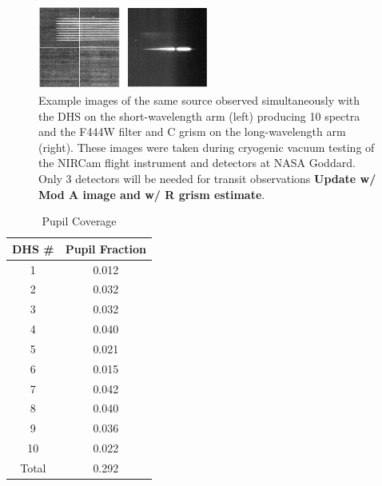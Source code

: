 \documentclass[iop]{emulateapj}
\begin{document}
\begin{figure}[!ht]
\includegraphics[width=0.5\textwidth]{dhs_image_example.png}
\caption{Example images of the same source observed simultaneously with the DHS on the short-wavelength arm (left) producing 10 spectra and the F444W filter and C grism on the long-wavelength arm (right).
These images were taken during cryogenic vacuum testing of the NIRCam flight instrument and detectors at NASA Goddard.
Only 3 detectors will be needed for transit observations \textbf{Update w/ Mod A image and w/ R grism estimate}.}\label{fig:DHSimage}
\end{figure}

\begin{table}
\centering
\begin{tabular}{cc}
DHS \# & Pupil Fraction \\
\hline \hline
1 & 0.012 \\
2 & 0.032 \\
3 &  0.032 \\
4 & 0.040 \\
5 & 0.021 \\
6 & 0.015 \\
7 & 0.042 \\
8 & 0.040 \\
9 & 0.036 \\
10 & 0.022 \\
\hline
Total & 0.292
\end{tabular}
\caption{Pupil Coverage}\label{tab:pupfrac}
\end{table}
\end{document}
